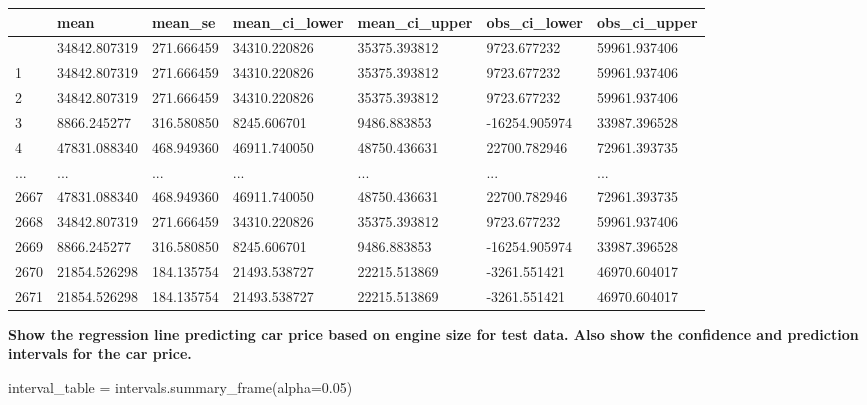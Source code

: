 \documentclass[
  letterpaper,
  DIV=11,
  numbers=noendperiod]{scrreprt}
\newenvironment{Shaded}{\begin{snugshade}}{\end{snugshade}}
\newcommand{\FloatTok}[1]{\textcolor[rgb]{0.68,0.00,0.00}{#1}}
\newcommand{\NormalTok}[1]{\textcolor[rgb]{0.00,0.23,0.31}{#1}}
\newcommand{\OperatorTok}[1]{\textcolor[rgb]{0.37,0.37,0.37}{#1}}
\begin{document}
\begin{longtable}[]{@{}lllllll@{}}
\toprule\noalign{}
& mean & mean\_se & mean\_ci\_lower & mean\_ci\_upper & obs\_ci\_lower &
obs\_ci\_upper \\
\midrule\noalign{}
\endhead
\bottomrule\noalign{}
\endlastfoot
0 & 34842.807319 & 271.666459 & 34310.220826 & 35375.393812 &
9723.677232 & 59961.937406 \\
1 & 34842.807319 & 271.666459 & 34310.220826 & 35375.393812 &
9723.677232 & 59961.937406 \\
2 & 34842.807319 & 271.666459 & 34310.220826 & 35375.393812 &
9723.677232 & 59961.937406 \\
3 & 8866.245277 & 316.580850 & 8245.606701 & 9486.883853 & -16254.905974
& 33987.396528 \\
4 & 47831.088340 & 468.949360 & 46911.740050 & 48750.436631 &
22700.782946 & 72961.393735 \\
... & ... & ... & ... & ... & ... & ... \\
2667 & 47831.088340 & 468.949360 & 46911.740050 & 48750.436631 &
22700.782946 & 72961.393735 \\
2668 & 34842.807319 & 271.666459 & 34310.220826 & 35375.393812 &
9723.677232 & 59961.937406 \\
2669 & 8866.245277 & 316.580850 & 8245.606701 & 9486.883853 &
-16254.905974 & 33987.396528 \\
2670 & 21854.526298 & 184.135754 & 21493.538727 & 22215.513869 &
-3261.551421 & 46970.604017 \\
2671 & 21854.526298 & 184.135754 & 21493.538727 & 22215.513869 &
-3261.551421 & 46970.604017 \\
\end{longtable}

\textbf{Show the regression line predicting car price based on engine
size for test data. Also show the confidence and prediction intervals
for the car price.}

\begin{Shaded}
\begin{Highlighting}[]
\NormalTok{interval\_table }\OperatorTok{=}\NormalTok{ intervals.summary\_frame(alpha}\OperatorTok{=}\FloatTok{0.05}\NormalTok{)}
\end{Highlighting}
\end{Shaded}
\end{document}
